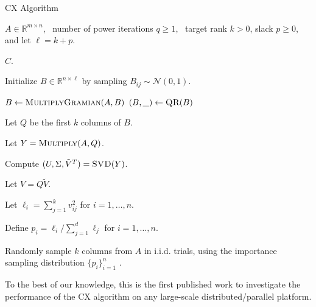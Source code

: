 \begin{algorithm}[tb]
   \caption{{\sc CX} Algorithm}
    \label{alg:cx}
    \begin{algorithmic}[1]
      \Require $A \in \mathbb{R}^{m\times n}$, \
        number of power iterations $q \ge 1$, \
        target rank $k > 0$, slack $p \ge 0$, and let $\ell=k+p$.

      \Ensure $C$.

      \State Initialize $B \in \mathbb{R}^{n\times \ell}$ by sampling $B_{ij} \sim \mathcal{N}(0, 1)$.

      \For{$q$ times}
          \State $B \gets \Call{MultiplyGramian}{A, B}$
          \State $(B, \_) \gets \Call{QR}{B}$
      \EndFor

      \State Let $Q$ be the first $k$ columns of $B$.

      \State Let $Y = \Call{Multiply}{A, Q}$.

      \State Compute $(U, \Sigma, \tilde V^T) = \Call{SVD}{Y}$.

      \State Let $V = Q \tilde V$.

	  \State Let $\ell_i = \sum_{j=1}^k v_{ij}^2$ for $i = 1, \ldots, n$.
      
      \State Define $p_i = \ell_i / \sum_{j=1}^d \ell_j$ for $i=1,\ldots,n$.
      
      \State Randomly sample $k$ columns from $A$ in i.i.d. trials, using the importance sampling distribution $\{p_i\}_{i=1}^n$ .
      \end{algorithmic}
  \end{algorithm}
To the best of our knowledge, this is the first published work to investigate the performance of the CX algorithm on any large-scale distributed/parallel platform.

